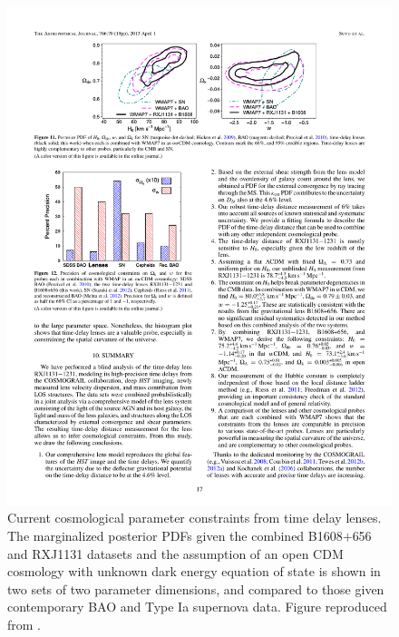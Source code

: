\begin{figure}[!ht]
\centering\includegraphics[width=0.9\linewidth]{figures/Suyu13_fig11.pdf}
\caption{Current cosmological parameter constraints from time delay
lenses. The marginalized posterior PDFs given the combined B1608$+$656
and RXJ1131 datasets and the assumption of an open CDM cosmology with
unknown dark energy equation of state is shown in
two sets of two parameter dimensions,
and compared to those given contemporary BAO and Type Ia supernova data.
Figure reproduced from \citet{Suy++14}.}
\label{fig:current-constraints}
\end{figure}

